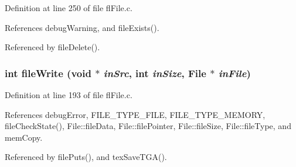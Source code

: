 Definition at line 250 of file fl\-File.c.

References debug\-Warning, and file\-Exists().

Referenced by file\-Delete().
\subsubsection{\setlength{\rightskip}{0pt plus 5cm}int file\-Write (void $\ast$ {\em in\-Src}, int {\em in\-Size}, {\bf File} $\ast$ {\em in\-File})}\label{flFile_8c_2c30646df4736c414f5017339780ea82}




Definition at line 193 of file fl\-File.c.

References debug\-Error, FILE\_\-TYPE\_\-FILE, FILE\_\-TYPE\_\-MEMORY, file\-Check\-State(), File::file\-Data, File::file\-Pointer, File::file\-Size, File::file\-Type, and mem\-Copy.

Referenced by file\-Puts(), and tex\-Save\-TGA().